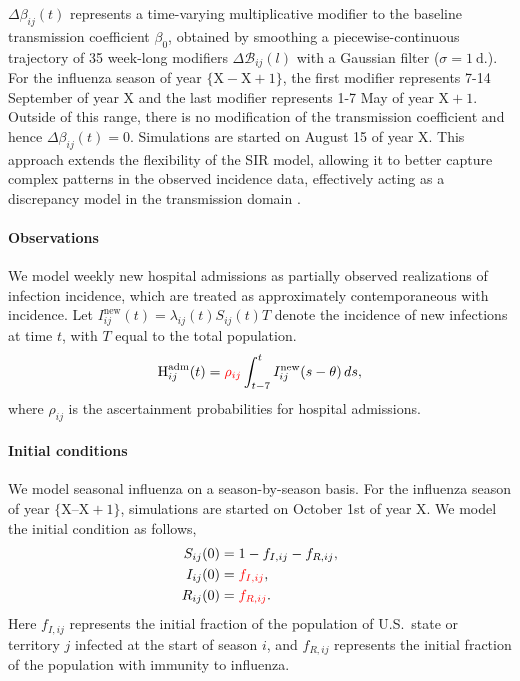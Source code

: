 \documentclass[11pt]{article}
\begin{document}
$\Delta \beta_{ij}(t)$ represents a time-varying multiplicative modifier to the baseline transmission coefficient $\beta_0$, obtained by smoothing a piecewise-continuous trajectory of 35 week-long modifiers $\Delta \mathcal{B}_{ij}(l)$ with a Gaussian filter ($\sigma = 1~\text{d.}$). For the influenza season of year $\{\text{X}-\text{X}+1\}$, the first modifier represents 7-14 September of year $\text{X}$ and the last modifier represents 1-7 May of year $\text{X}+1$. Outside of this range, there is no modification of the transmission coefficient and hence $\Delta \beta_{ij}(t)=0$. Simulations are started on August 15 of year $\text{X}$. This approach extends the flexibility of the SIR model, allowing it to better capture complex patterns in the observed incidence data, effectively acting as a discrepancy model in the transmission domain \citep{osthus2019}.

\paragraph{Observations} We model weekly new hospital admissions as partially observed realizations of infection incidence, which are treated as approximately contemporaneous with incidence. Let \( I_{ij}^{\text{new}}(t) = \lambda_{ij}(t) S_{ij}(t) T \) denote the incidence of new infections at time \(t\), with $T$ equal to the total population. 
\begin{equation}\label{eq:observed_states}
    \text{H}^{\text{adm}}_{ij}(t) 
    = \textcolor{red}{\rho_{ij}} \int_{t-7}^{t} I^{\text{new}}_{ij}(s - \theta)\, ds,
\end{equation}
where \( \rho_{ij} \) is the ascertainment probabilities for hospital admissions.

\paragraph{Initial conditions} We model seasonal influenza on a season-by-season basis. For the influenza season of year $\{\text{X} \text{--} \text{X}+1\}$, simulations are started on October 1st of year $\text{X}$. We model the initial condition as follows,
\begin{align}\label{eq:initial_condition}
    S_{ij}(0) &= 1- f_{I,ij}-f_{R,ij}, \nonumber \\
    I_{ij}(0) &= \textcolor{red}{f_{I,ij}}, \nonumber \\
    R_{ij}(0) &= \textcolor{red}{f_{R,ij}}. 
\end{align}
Here $f_{I,ij}$ represents the initial fraction of the population of U.S.\ state or territory $j$ infected at the start of season $i$, and $f_{R,ij}$ represents the initial fraction of the population with immunity to influenza.\\
\end{document}
